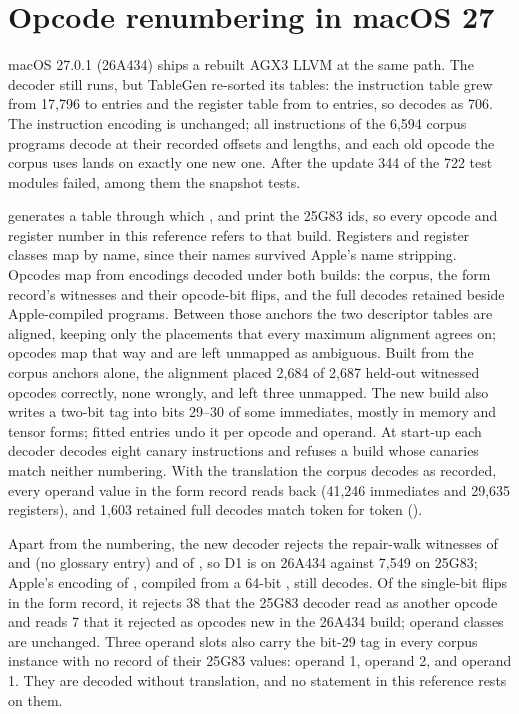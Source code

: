 \section{Opcode renumbering in macOS 27}\label{sec:decoder-renumbering}

macOS 27.0.1 (26A434) ships a rebuilt AGX3 LLVM at the same path. The decoder still runs, but TableGen re-sorted its
tables: the instruction table grew from 17,796 to  entries and the register table from  to  entries,
so  decodes as 706. The instruction encoding is unchanged; all  instructions of the 6,594 corpus
programs decode at their recorded offsets and lengths, and each old opcode the corpus uses lands on exactly one new one.
After the update 344 of the 722 test modules failed, among them the snapshot tests.

 generates a table through which ,  and  print
the 25G83 ids, so every opcode and register number in this reference refers to that build. Registers and register
classes map by name, since their names survived Apple's name stripping. Opcodes map from  encodings decoded under
both builds: the corpus, the form record's witnesses and their opcode-bit flips, and the full decodes retained beside
Apple-compiled programs. Between those anchors the two descriptor tables are aligned, keeping only the placements that
every maximum alignment agrees on;  opcodes map that way and  are left unmapped as ambiguous. Built from the
corpus anchors alone, the alignment placed 2,684 of 2,687 held-out witnessed opcodes correctly, none wrongly, and left
three unmapped. The new build also writes a two-bit tag into bits 29–30 of some immediates, mostly in memory and
tensor forms;  fitted entries undo it per opcode and operand. At start-up each decoder decodes eight canary
instructions and refuses a build whose canaries match neither numbering. With the translation the corpus decodes as
recorded, every operand value in the form record reads back (41,246 immediates and 29,635 registers), and 1,603
retained full decodes match token for token ().

Apart from the numbering, the new decoder rejects the repair-walk witnesses of
 and  (no glossary entry) and of , so D1 is  on
26A434 against 7,549 on 25G83; Apple's encoding of , compiled from a 64-bit , still
decodes. Of the single-bit flips in the form record, it rejects 38 that the 25G83 decoder read as another opcode and
reads 7 that it rejected as opcodes new in the 26A434 build; operand classes are unchanged. Three operand slots also
carry the bit-29 tag in every corpus instance with no record of their 25G83 values:  operand 1,  operand 2, and
 operand 1. They are decoded without translation, and no statement in this reference rests on them.

